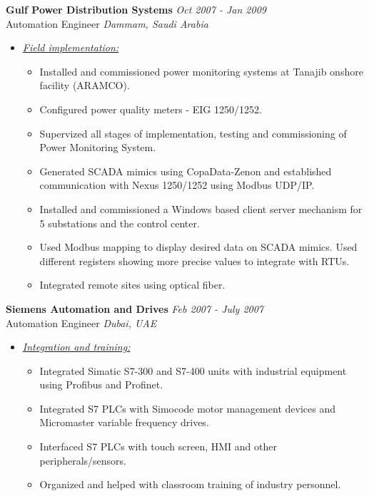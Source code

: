 \documentclass{article}
\begin{document}
    {\bf Gulf Power Distribution Systems} \hfill {\em Oct 2007 - Jan 2009} \\
    Automation Engineer \hfill {\em Dammam, Saudi Arabia} \\
    \begin{itemize}
    \item \underline{\it Field implementation:}
          \begin{itemize}
          \item Installed and commissioned power monitoring systems at Tanajib
                onshore facility (ARAMCO).
          \item Configured power quality meters - EIG 1250/1252.
          \item Supervized all stages of implementation, testing and
                commissioning of Power Monitoring System.
          \item Generated SCADA mimics using CopaData-Zenon and established
                communication with Nexus 1250/1252 using Modbus UDP/IP.
          \item Installed and commissioned a Windows based client server
                mechanism for 5 substations and the control center.
          \item Used Modbus mapping to display desired data on SCADA mimics.
                Used different registers showing more precise values to
                integrate with RTUs.
          \item Integrated remote sites using optical fiber.
          \end{itemize}
    \end{itemize}
    \bigskip

    {\bf Siemens Automation and Drives} \hfill {\em Feb 2007 - July 2007} \\
    Automation Engineer \hfill {\em Dubai, UAE} \\
    \begin{itemize}
    \item \underline{\it Integration and training:}
          \begin{itemize}
          \item Integrated Simatic S7-300 and S7-400 units with industrial
                equipment using Profibus and Profinet.
          \item Integrated S7 PLCs with Simocode motor management devices and
                Micromaster variable frequency drives.
          \item Interfaced S7 PLCs with touch screen, HMI and other
                peripherals/sensors.
          \item Organized and helped with classroom training of industry
                personnel.
          \end{itemize}
    \end{itemize}
    \bigskip
\end{document}
